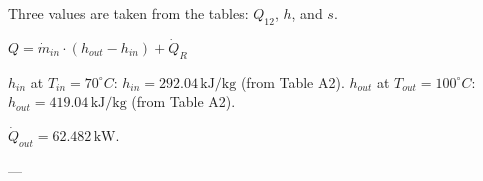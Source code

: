 Three values are taken from the tables: \( Q_{12} \), \( h \), and \( s \).  

\( Q = \dot{m}_{in} \cdot (h_{out} - h_{in}) + \dot{Q}_R \)  

\( h_{in} \) at \( T_{in} = 70^\circ C \): \( h_{in} = 292.04 \, \text{kJ/kg} \) (from Table A2).  
\( h_{out} \) at \( T_{out} = 100^\circ C \): \( h_{out} = 419.04 \, \text{kJ/kg} \) (from Table A2).  

\( \dot{Q}_{out} = 62.482 \, \text{kW} \).  

---